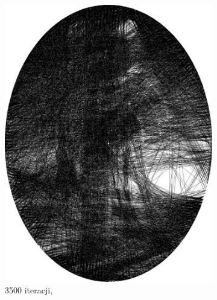 \begin{figure}[htb]
\begin{subfigure}{0.19\textwidth}
            \includegraphics[width = \textwidth]{img/2-theory/aldrin/000mask-aldrin_ellipse_3500_threaded.png}
            \caption{3500 iteracji, }
            \label{theory-technics-mask-aldrin-threaded-e}
        \end{subfigure}
        \begin{subfigure}{0.19\textwidth}
            \centering

\end{subfigure}
\end{figure}
